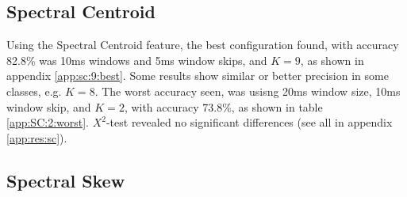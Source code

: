 	\subsection{Spectral Centroid}

		Using the Spectral Centroid feature, the best configuration found, with accuracy 82.8\% was 10ms windows and 5ms window skips, and $K=9$, as shown in appendix \ref{app:sc:9:best}. Some results show similar or better precision in some classes, e.g. $K=8$. The worst accuracy seen, was usisng 20ms window size, 10ms window skip, and $K=2$, with accuracy 73.8\%, as shown in table \ref{app:SC:2:worst}. $X^2$-test revealed no significant differences (see all in appendix \ref{app:res:sc}).
		
				
	\subsection{Spectral Skew}
			
